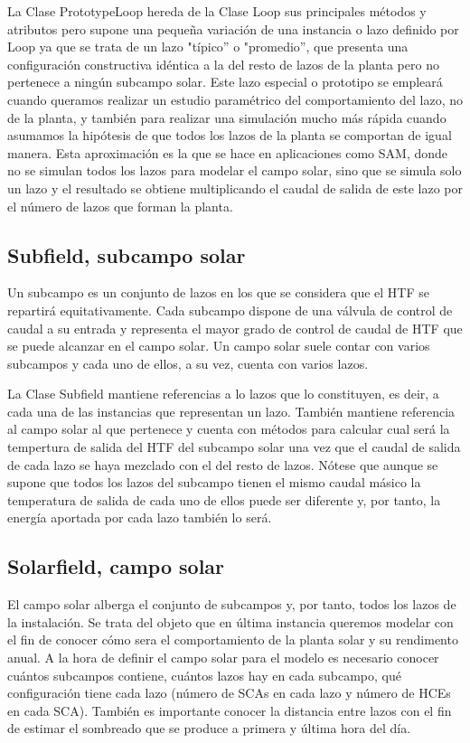 La Clase PrototypeLoop hereda de la Clase Loop sus principales métodos y atributos pero supone una pequeña variación de una instancia o lazo definido por Loop ya que se trata de un lazo  "típico'' o "promedio'', que presenta una configuración constructiva idéntica a la del resto de lazos de la planta pero no pertenece a ningún subcampo solar. Este lazo especial o prototipo se empleará cuando queramos realizar un estudio paramétrico del comportamiento del lazo, no de la planta, y también para realizar una simulación mucho más rápida cuando asumamos la hipótesis de que todos los lazos de la planta se comportan de igual manera. Esta aproximación es la que se hace en aplicaciones como SAM, donde no se simulan todos los lazos para modelar el campo solar, sino que se simula solo un lazo y el resultado se obtiene multiplicando el caudal de salida de este lazo por el número de lazos que forman la planta. 

\subsection{Subfield, subcampo solar}
\label{subfield}

Un subcampo es un conjunto de lazos en los que se considera que el HTF se repartirá equitativamente. Cada subcampo dispone de una válvula de control de caudal a su entrada y representa el mayor grado de control de caudal de HTF que se puede alcanzar en el campo solar. Un campo solar suele contar con varios subcampos y cada uno de ellos, a su vez, cuenta con varios lazos.  

La Clase Subfield mantiene referencias a lo lazos que lo constituyen, es deir, a cada una de las instancias que representan un lazo. También mantiene referencia al campo solar al que pertenece y cuenta con métodos para calcular cual será la tempertura de salida del HTF del subcampo solar una vez que el caudal de salida de cada lazo se haya mezclado con el del resto de lazos. Nótese que aunque se supone que todos los lazos del subcampo tienen el mismo caudal másico la temperatura de salida de cada uno de ellos puede ser diferente y, por tanto, la energía aportada por cada lazo también lo será. 

\subsection{Solarfield, campo solar}
\label{solarfield}

El campo solar alberga el conjunto de subcampos y, por tanto, todos los lazos de la instalación. Se trata del objeto que en última instancia queremos modelar con el fin de conocer cómo sera el comportamiento de la planta solar y su rendimento anual. A la hora de definir el campo solar para el modelo es necesario conocer cuántos subcampos contiene, cuántos lazos hay en cada subcampo, qué configuración tiene cada lazo (número de SCAs en cada lazo y número de HCEs en cada SCA). También es importante conocer la distancia entre lazos con el fin de estimar el sombreado que se produce a primera y última hora del día. 

